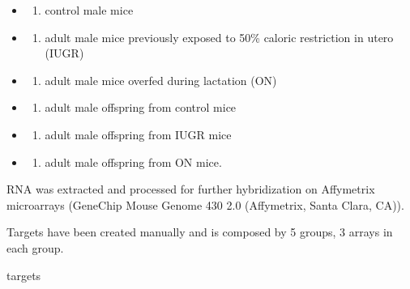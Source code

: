 \documentclass[]{article}
\newenvironment{Shaded}{\begin{snugshade}}{\end{snugshade}}
\newcommand{\NormalTok}[1]{#1}
\providecommand{\tightlist}{%
  \setlength{\itemsep}{0pt}\setlength{\parskip}{0pt}}
\begin{document}
\begin{itemize}
\item
  \begin{enumerate}
  \def\labelenumi{\alph{enumi})}
  \tightlist
  \item
    control male mice
  \end{enumerate}
\item
  \begin{enumerate}
  \def\labelenumi{\alph{enumi})}
  \setcounter{enumi}{1}
  \tightlist
  \item
    adult male mice previously exposed to 50\% caloric restriction in
    utero (IUGR)
  \end{enumerate}
\item
  \begin{enumerate}
  \def\labelenumi{\alph{enumi})}
  \setcounter{enumi}{2}
  \tightlist
  \item
    adult male mice overfed during lactation (ON)
  \end{enumerate}
\item
  \begin{enumerate}
  \def\labelenumi{\alph{enumi})}
  \setcounter{enumi}{3}
  \tightlist
  \item
    adult male offspring from control mice
  \end{enumerate}
\item
  \begin{enumerate}
  \def\labelenumi{\alph{enumi})}
  \setcounter{enumi}{4}
  \tightlist
  \item
    adult male offspring from IUGR mice
  \end{enumerate}
\item
  \begin{enumerate}
  \def\labelenumi{\alph{enumi})}
  \setcounter{enumi}{5}
  \tightlist
  \item
    adult male offspring from ON mice.
  \end{enumerate}
\end{itemize}

RNA was extracted and processed for further hybridization on Affymetrix
microarrays (GeneChip Mouse Genome 430 2.0 (Affymetrix, Santa Clara,
CA)).

Targets have been created manually and is composed by 5 groups, 3 arrays
in each group.

\begin{Shaded}
\begin{Highlighting}[]
\NormalTok{targets}
\end{Highlighting}
\end{Shaded}
\end{document}
